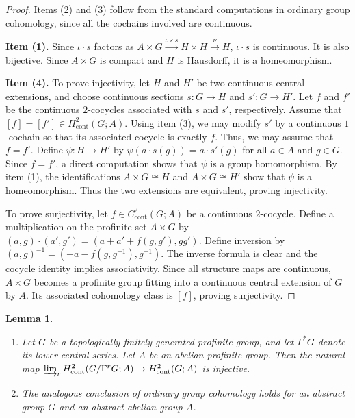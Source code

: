 \documentclass[11pt]{amsart}
\newtheorem{lemma}[theorem]{Lemma}
\theoremstyle{definition}
\numberwithin{equation}{section}
\numberwithin{equation}{section}
\DeclareMathOperator{\cont}{cont}
\begin{document}
\begin{proof}
Items (2) and (3) follow from the standard computations in ordinary group cohomology, since all the cochains involved are continuous.

\textbf{Item (1). } Since $\iota\cdot s$ factors as $A\times G\xrightarrow{\iota\times s}H\times H\xrightarrow{\nu} H$, $\iota\cdot s$ is continuous. It is also bijective. Since $A\times G$ is compact and $H$ is Hausdorff, it is a homeomorphism.

\textbf{Item (4). } To prove injectivity, let $H$ and $H'$ be two continuous central extensions, and choose continuous sections $s:G\rightarrow H$ and $s':G\rightarrow H'$. Let $f$ and $f'$ be the continuous $2$-cocycles associated with $s$ and $s'$, respectively. Assume that $[f]=[f']\in H^2_{\cont}(G;A)$. Using item (3), we may modify $s'$ by a continuous $1$-cochain so that its associated cocycle is exactly $f$. Thus, we may assume that $f=f'$. Define $\psi:H\rightarrow H'$ by $\psi(a\cdot s(g))=a\cdot s'(g)$ for all $a\in A$ and $g\in G$. Since $f=f'$, a direct computation shows that $\psi$ is a group homomorphism. By item (1), the identifications $A\times G\cong H$ and $A\times G\cong H'$ show that $\psi$ is a homeomorphism. Thus the two extensions are equivalent, proving injectivity.

To prove surjectivity, let $f\in C^2_{\cont}(G;A)$ be a continuous $2$-cocycle. Define a multiplication on the profinite set $A\times G$ by $(a,g)\cdot (a',g')=(a+a'+f(g,g'),gg')$. Define inversion by $(a,g)^{-1}=(-a-f(g,g^{-1}),g^{-1})$. The inverse formula is clear and the cocycle identity implies associativity. Since all structure maps are continuous, $A\times G$ becomes a profinite group fitting into a continuous central extension of $G$ by $A$. Its associated cohomology class is $[f]$, proving surjectivity.
\end{proof}

\begin{lemma}\label{Lem: injectivity of colimit of lower central series into group}
\begin{enumerate}[leftmargin=0.25in]
    \item Let $G$ be a topologically finitely generated profinite group, and let $\Gamma^*G$ denote its lower central series. Let $A$ be an abelian profinite group. Then the natural map $\varinjlim_r H^2_{\cont}(G/\Gamma^rG;A)\rightarrow H^2_{\cont}(G;A)$ is injective. 
    \item The analogous conclusion of ordinary group cohomology holds for an abstract group $G$ and an abstract abelian group $A$.
\end{enumerate}
\end{lemma} 
\end{document}
